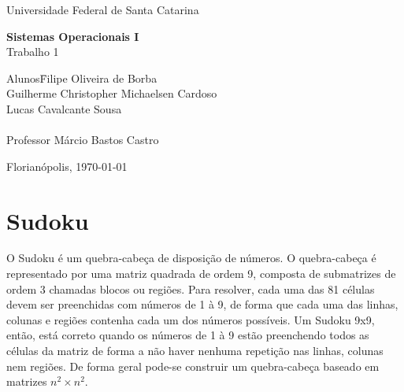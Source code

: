\documentclass[a4paper, 12pt]{article}
\begin{document}
\begin{titlepage}
    \begin{center}
        \huge{Universidade Federal de Santa Catarina}

        \vspace{10pt}

        \vspace{85pt}

        \textbf{\LARGE{Sistemas Operacionais I}}
        \large{\\Trabalho 1}
        \vspace{160pt}

    \end{center}

    \begin{flushleft}
        \begin{tabbing}
            Alunos\qquad\qquad\=
            Filipe Oliveira de Borba\\
            \>Guilherme Christopher Michaelsen Cardoso\\
            \>Lucas Cavalcante Sousa\\\\
            Professor\> Márcio Bastos Castro \\
        \end{tabbing}
    \end{flushleft}

    \begin{center}
        \vspace{\fill}
        Florianópolis, \today
    \end{center}
\end{titlepage}


\newpage
\tableofcontents
\thispagestyle{empty}


\newpage
{}

\section{Sudoku}
O Sudoku é um quebra-cabeça de disposição de números. O quebra-cabeça é
representado por uma matriz quadrada de ordem 9, composta de submatrizes de
ordem 3 chamadas blocos ou regiões. Para resolver, cada uma das 81 células
devem ser preenchidas com números de 1 à 9, de forma que cada uma das linhas,
colunas e regiões contenha cada um dos números possíveis. Um Sudoku 9x9, então,
está correto quando os números de 1 à 9 estão preenchendo todos as células da
matriz de forma a não haver nenhuma repetição nas linhas, colunas nem regiões.
De forma geral pode-se construir um quebra-cabeça baseado em matrizes
$n^2 \times n^2$.
\end{document}
